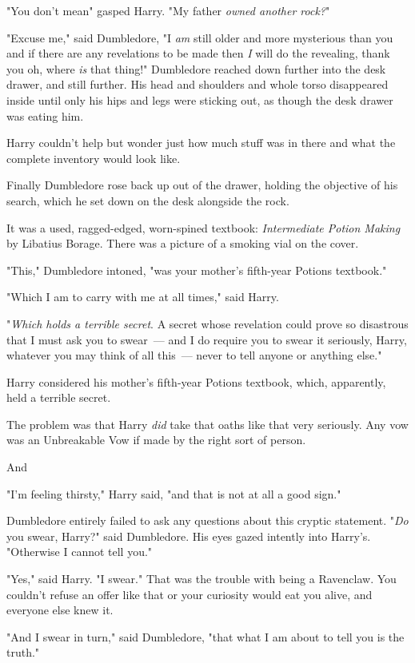 "You don't mean{\el}" gasped Harry. "My father{\el} \emph{owned another
rock?}"

"Excuse me," said Dumbledore, "I \emph{am} still older and more mysterious than
you and if there are any revelations to be made then \emph{I} will do the
revealing, thank you{\el} oh, where \emph{is} that thing!" Dumbledore
reached down further into the desk drawer, and still further. His head and
shoulders and whole torso disappeared inside until only his hips and legs were
sticking out, as though the desk drawer was eating him.

Harry couldn't help but wonder just how much stuff was in there and what the
complete inventory would look like.

Finally Dumbledore rose back up out of the drawer, holding the objective of his
search, which he set down on the desk alongside the rock.

It was a used, ragged-edged, worn-spined textbook: \emph{Intermediate Potion
Making} by Libatius Borage. There was a picture of a smoking vial on the cover.

"This," Dumbledore intoned, "was your mother's fifth-year Potions textbook."

"Which I am to carry with me at all times," said Harry.

"\emph{Which holds a terrible secret}. A secret whose revelation could prove so
disastrous that I must ask you to swear~--- and I do require you to swear it
seriously, Harry, whatever you may think of all this~--- never to tell anyone or
anything else."

Harry considered his mother's fifth-year Potions textbook, which, apparently,
held a terrible secret.

The problem was that Harry \emph{did} take that oaths like that very seriously.
Any vow was an Unbreakable Vow if made by the right sort of person.

And{\el}

"I'm feeling thirsty," Harry said, "and that is not at all a good sign."

Dumbledore entirely failed to ask any questions about this cryptic statement.
"\emph{Do} you swear, Harry?" said Dumbledore. His eyes gazed intently into
Harry's. "Otherwise I cannot tell you."

"Yes," said Harry. "I swear." That was the trouble with being a Ravenclaw. You
couldn't refuse an offer like that or your curiosity would eat you alive, and
everyone else knew it.

"And I swear in turn," said Dumbledore, "that what I am about to tell you is
the truth."

